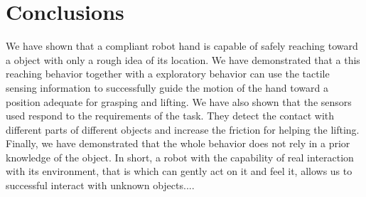 \section{Conclusions}
\label{sec:conclusions}

We have shown that a compliant robot hand is capable of safely
reaching toward a object with only a rough idea of its location.
We have demonstrated that a this reaching behavior together with a
exploratory behavior can use the tactile sensing information to
successfully guide the motion of the hand toward a position
adequate for grasping and lifting. We have also shown that the
sensors used respond to the requirements of the task. They detect
the contact with different parts of different objects and increase
the friction for helping the lifting. Finally, we have
demonstrated that the whole behavior does not rely in a prior
knowledge of the object. In short, a robot with the capability of
real interaction with its environment, that is which can gently
act on it and feel it, allows us to successful interact with
unknown objects....



